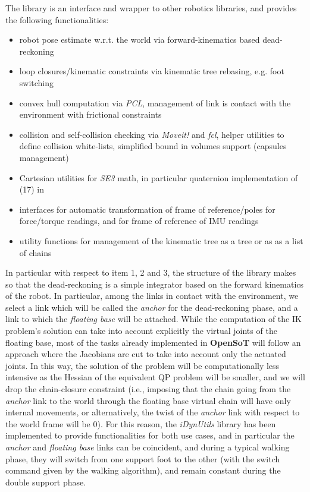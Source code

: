 The library is an interface and wrapper to other robotics libraries, and provides the following functionalities:
\begin{itemize}
\item robot pose estimate w.r.t. the world via forward-kinematics based dead-reckoning
\item loop closures/kinematic constraints via kinematic tree rebasing, e.g. foot switching
\item convex hull computation via \emph{PCL}, management of link is contact with the environment with frictional constraints
\item collision and self-collision checking via \emph{Moveit!} and \emph{fcl}, helper utilities to define collision white-lists, simplified bound in volumes support (capsules management)
\item Cartesian utilities for \emph{SE3} math, in particular quaternion implementation of (17) in \cite{rocchimingo:16}%
\item interfaces for automatic transformation of frame of reference/poles for force/torque readings, and for frame of reference of IMU readings
\item utility functions for management of the kinematic tree as a tree or as as a list of chains
\end{itemize}
In particular with respect to item 1, 2 and 3, the structure of the library makes so that the dead-reckoning is a simple integrator based on the forward kinematics of the robot.
In particular, among the links in contact with the environment, we select a link which will be called the  \emph{anchor} for the dead-reckoning phase, and a link to which the \emph{floating base} will be attached. While the computation of the IK problem's solution can take into account explicitly the virtual joints of the floating base, most of the tasks already implemented in \textbf{OpenSoT} will follow an approach where the Jacobians are cut to take into account only the actuated joints. In this way, the solution of the problem will be computationally less intensive as the Hessian of the equivalent QP problem will be smaller, and we will drop the chain-closure constraint (i.e., imposing that the chain going from the \emph{anchor} link to the world through the floating base virtual chain will have only internal movements, or alternatively, the twist of the \emph{anchor} link with respect to the world frame will be $0$). For this reason, the \emph{iDynUtils} library has been implemented to provide functionalities for both use cases, and in particular the \emph{anchor} and \emph{floating base} links can be coincident, and during a typical walking phase, they will switch from one support foot to the other (with the switch command given by the walking algorithm), and remain constant during the double support phase.

